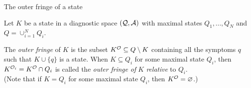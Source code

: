 \documentclass{beamer}
\def\tl{\vskip 2mm}
\def\es{\varnothing}
\def\itvvs{\vspace{-.15cm}\item}
\def\SB{\subseteq}
\def\AAA{{\cal A}}
\def\OOO{{\cal O}}
\def\QQQ{{\cal Q}}
\begin{document}
\begin{frame}{The outer fringe of a state}
\vspace{-1.3cm}

\begin{definition}\label{def_in_out_diag} Let $K$ be a state in   a diagnostic space $(\QQQ,\AAA)$ with maximal states $Q_1,...,Q_N$ and $Q=\cup_{i=1}^N Q_i$.
\tl
\begin{roster}
  \itvvs 
  The  {\sl outer fringe} of $K$ is  the subset $K^\OOO\SB Q\setminus K$ containing all the symptoms $q$ such that $K\cup \{q\}$ is a state. When $K\SB Q_i$ for some maximal state $Q_i$, then $K^{\OOO_i} = K^\OOO\cap Q_i$ is called the {\sl outer fringe of} $K$ {\sl relative} to 
 $Q_i$.\\[2mm] (Note that if $K=Q_i$ for some maximal state $Q_i$, then $K^\OOO= \es$.) 
 \end{roster} 
 \end{definition} 
  \vspace{.5cm}

\end{frame}
\end{document}
